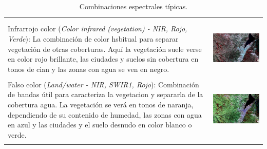 \documentclass[a4paper,12pt]{book}
\begin{document}
\begin{table}[H]
\begin{tabular}{m{} c}
\begin{minipage}{.4\textwidth}
        \end{minipage}\\
        &\\
        Infrarrojo color (\emph{Color infrared (vegetation) - NIR, Rojo, Verde}): La combinación de color hsbitual para separar vegetación de otras coberturas. Aquí la vegetación suele verse en color rojo brillante, las ciudades y suelos sin cobertura en tonos de cian y las zonas con agua se ven en negro. &
        \begin{minipage}{.4\textwidth} \includegraphics[width=\linewidth]{8-4-3.jpeg}
        \end{minipage}\\
        &\\
        Falso color (\emph{Land/water - NIR, SWIR1, Rojo}): Combinación de bandas útil para caracteriza la vegetacion y separarla de la cobertura agua. La vegetación se verá en tonos de naranja, dependiendo de su contenido de humedad, las zonas con agua en azul y las ciudades y el suelo desnudo en  color blanco o verde. &
        \begin{minipage}{.4\textwidth} \includegraphics[width=\linewidth]{8-11-4.jpeg}
        \end{minipage}\\
        &\\
        \bottomrule
    \end{tabular}
    \caption{Combinaciones espectrales típicas.}
    \label{tab:ce}
\end{table}
\vfill
\hspace{0pt}
\end{document}

